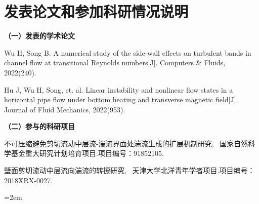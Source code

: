 
\chapter*{发表论文和参加科研情况说明}
\setlength{\parindent}{0em}
\textbf{（一）发表的学术论文}
\begin{publist}
\item Wu H, Song B. A numerical study of the side-wall effects on turbulent bands in channel flow at transitional Reynolds numbers[J]. Computers \& Fluids, 2022(240).
\item Hu J, Wu H, Song, et. al. Linear instability and nonlinear flow states in a horizontal pipe flow under bottom heating and transverse magnetic field[J]. Journal of Fluid Mechanics, 2022(953).
\end{publist}


\vspace*{1em}
\textbf{（二）参与的科研项目}
\begin{publist}
\item	不可压缩避免剪切流动中层流-湍流界面处湍流生成的扩展机制研究, ~国家自然科学基金重大研究计划培育项目.项目编号：91852105.
\item	壁面剪切流动中层流向湍流的转捩研究, ~天津大学北洋青年学者项目.项目编号：2018XRX-0027.
\end{publist}
\vfill
{}\hangindent=2em\noindent

\setlength{\parindent}{2em}